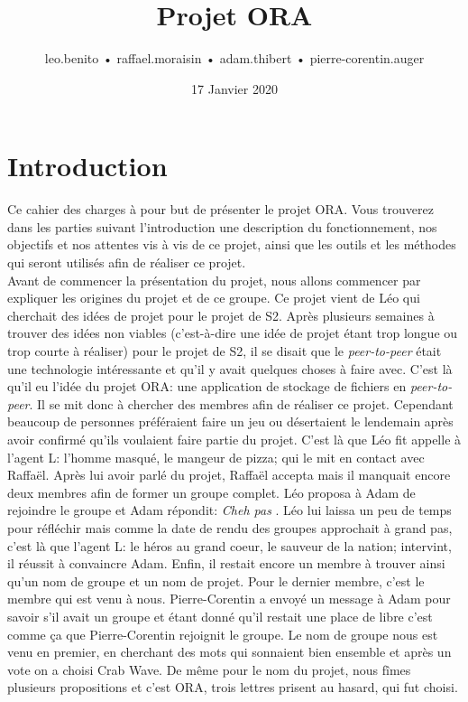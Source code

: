\documentclass[11pt, a4paper]{specifications}
\title{Projet ORA}
\author{leo.benito  •  raffael.moraisin  •  adam.thibert  •  pierre-corentin.auger}
\date{17 Janvier 2020}
\begin{document}
  \maketitle
  \thispagestyle{empty}   %
  \clearpage
 
  \tableofcontents
  \clearpage

  \section{Introduction}
Ce cahier des charges à pour but de présenter le projet ORA. Vous trouverez dans les parties suivant l'introduction une description du fonctionnement, nos objectifs et nos attentes vis à vis de ce projet, ainsi que les outils et les méthodes qui seront utilisés afin de réaliser ce projet.\\

Avant de commencer la présentation du projet, nous allons commencer par expliquer les origines du projet et de ce groupe.\newline
Ce projet vient de Léo qui cherchait des idées de projet pour le projet de S2. Après plusieurs semaines à trouver des idées non viables (c'est-à-dire une idée de projet étant trop longue ou trop courte à réaliser) pour le projet de S2, il se disait que le \textit{peer-to-peer} était une technologie intéressante et qu'il y avait quelques choses à faire avec. C'est là qu'il eu l'idée du projet ORA: une application de stockage de fichiers en \textit{peer-to-peer}. \newline
Il se mit donc à chercher des membres afin de réaliser ce projet. Cependant beaucoup de personnes préféraient faire un jeu ou désertaient le lendemain après avoir confirmé qu'ils voulaient faire partie du projet. C'est là que Léo fit appelle à l'agent L: l'homme masqué, le mangeur de pizza; qui le mit en contact avec Raffaël. Après lui avoir parlé du projet, Raffaël accepta mais il manquait encore deux membres afin de former un groupe complet. \newline
Léo proposa à Adam de rejoindre le groupe et Adam répondit: \textit{\og Cheh pas \fg}. Léo lui laissa un peu de temps pour réfléchir mais comme la date de rendu des groupes approchait à grand pas, c'est là que l'agent L: le héros au grand coeur, le sauveur de la nation; intervint, il réussit à convaincre Adam. \newline
Enfin, il restait encore un membre à trouver ainsi qu'un nom de groupe et un nom de projet. Pour le dernier membre, c'est le membre qui est venu à nous. Pierre-Corentin a envoyé un message à Adam pour savoir s'il avait un groupe et étant donné qu'il restait une place de libre c'est comme ça que Pierre-Corentin rejoignit le groupe. \newline
Le nom de groupe nous est venu en premier, en cherchant des mots qui sonnaient bien ensemble et après un vote on a choisi Crab Wave. De même pour le nom du projet, nous fîmes plusieurs propositions et c'est ORA, trois lettres prisent au hasard, qui fut choisi.\\
\end{document}
